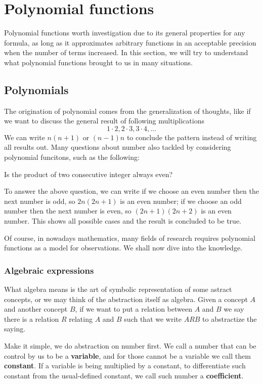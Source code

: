 \documentclass[12pt]{article}
\begin{document}
    \newpage 

    \section{Polynomial functions}

    Polynomial functions worth investigation due to its general properties for any formula, as long as it approximates arbitrary functions in an acceptable precision when the number of terms increased. In this section, we will try to understand what polynomial functions brought to us in many situations.

    \subsection{Polynomials}

    The origination of polynomial comes from the generalization of thoughts, like if we want to discuss the general result of following multiplications \[1\cdot 2, 2\cdot 3, 3\cdot 4, \dots\]
    We can write $n(n+1)$ or $(n-1)n$ to conclude the pattern instead of writing all results out. Many questions about number also tackled by considering polynomial funcitons, such as the following: 
    
    Is the product of two consecutive integer always even?

    To answer the above question, we can write if we choose an even number then the next number is odd, so $2n(2n+1)$ is an even number; if we choose an odd number then the next number is even, so $(2n+1)(2n+2)$ is an even number. This shows all possible cases and the result is concluded to be true.

    Of course, in nowadays mathematics, many fields of research requires polynomial functions as a model for observations. We shall now dive into the knowledge.
    \subsubsection*{Algebraic expressions}

    What algebra means is the art of symbolic representation of some astract concepts, or we may think of the abstraction itself as algebra. Given a concept $A$ and another concept $B$, if we want to put a relation between $A$ and $B$ we say there is a relation $R$ relating $A$ and $B$ such that we write $ARB$ to abstractize the saying.
    
    Make it simple, we do abstraction on number first. We call a number that can be control by us to be a \textbf{variable}, and for those cannot be a variable we call them \textbf{constant}. If a variable is being multiplied by a constant, to differentiate such constant from the usual-defined constant, we call such number a \textbf{coefficient}.
\end{document}
